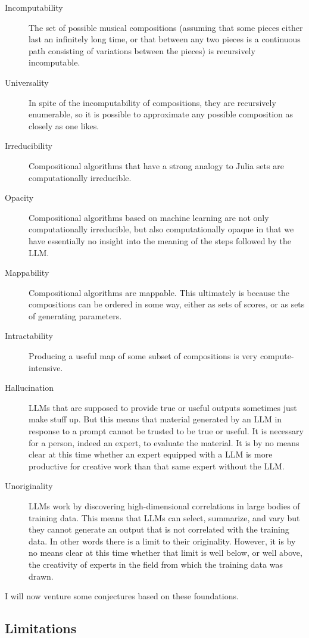 \documentclass[11pt]{scrartcl}
\begin{document}
\begin{description}
\item[Incomputability] The set of possible musical compositions (assuming that some pieces either last an infinitely long time, or that between any two pieces is a continuous path consisting of variations between the pieces) is recursively incomputable.
\item[Universality] In spite of the incomputability of compositions, they are recursively enumerable, so it is possible to approximate any possible composition as closely as one likes.
\item[Irreducibility] Compositional algorithms that have a strong analogy to Julia sets are computationally irreducible.
\item[Opacity] Compositional algorithms based on machine learning are not only computationally irreducible, but also computationally opaque in that we have essentially no insight into the meaning of the steps followed by the LLM.
\item[Mappability] Compositional algorithms are mappable. This ultimately is because the compositions can be ordered in some way, either as sets of scores, or as sets of generating parameters.
\item[Intractability] Producing a useful map of some subset of compositions is very compute-intensive. 
\item[Hallucination] LLMs that are supposed to provide true or useful outputs sometimes just make stuff up. But this means that material generated by an LLM in response to a prompt cannot be trusted to be true or useful. It is necessary for a person, indeed an expert, to evaluate the material. It is by no means clear at this time whether an expert equipped with a LLM is more productive for creative work than that same expert without the LLM.
\item[Unoriginality] LLMs work by discovering high-dimensional correlations in large bodies of training data. This means that LLMs can select, summarize, and vary but they cannot generate an output that is not correlated with the training data. In other words there is a limit to their originality. However, it is by no means clear at this time whether that limit is well below, or well above, the creativity of experts in the field from which the training data was drawn.
\end{description}

I will now venture some conjectures based on these foundations.

\subsection*{Limitations}
\end{document}

